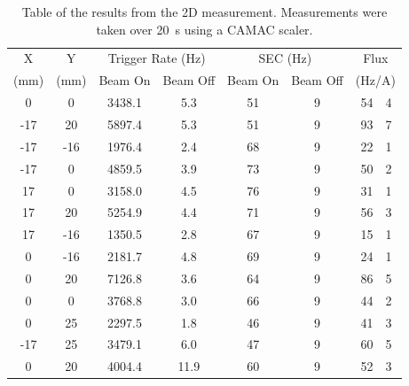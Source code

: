  \begin{table}
    \begin{center}
    \begin{tabular}{c|c|c|c|c|c|r@{\( \pm \)}l}
        X     &   Y    &  \multicolumn{2}{c|}{Trigger Rate (Hz)}  &  \multicolumn{2}{c|}{SEC (Hz)}  &  \multicolumn{2}{c}{Flux}     \\
        (mm)  &  (mm)  &  Beam On          &  Beam Off        &  Beam On    &  Beam Off    &  \multicolumn{2}{c}{(Hz/A)}   \\
        \hline %
          0  &    0    &   3438.1          &    5.3           &      51     &           9  & 54  &  4 \\
        -17  &   20    &   5897.4          &    5.3           &      51     &           9  & 93  &  7 \\
        -17  &  -16    &   1976.4          &    2.4           &      68     &           9  & 22  &  1 \\
        -17  &    0    &   4859.5          &    3.9           &      73     &           9  & 50  &  2 \\
         17  &    0    &   3158.0          &    4.5           &      76     &           9  & 31  &  1 \\
         17  &   20    &   5254.9          &    4.4           &      71     &           9  & 56  &  3 \\
         17  &  -16    &   1350.5          &    2.8           &      67     &           9  & 15  &  1 \\
          0  &  -16    &   2181.7          &    4.8           &      69     &           9  & 24  &  1 \\
          0  &   20    &   7126.8          &    3.6           &      64     &           9  & 86  &  5 \\
          0  &    0    &   3768.8          &    3.0           &      66     &           9  & 44  &  2 \\
          \hline
          0  &   25    &   2297.5          &    1.8           &      46     &           9  & 41  &  3 \\
        -17  &   25    &   3479.1          &    6.0           &      47     &           9  & 60  &  5 \\
          0  &   20    &   4004.4          &   11.9           &      60     &           9  & 52  &  3 \\
    \end{tabular}
    \end{center}
    \caption{Table of the results from the 2D measurement. Measurements were taken over 20~s using a CAMAC scaler.}
    \label{tab:2d_res}
 \end{table}

